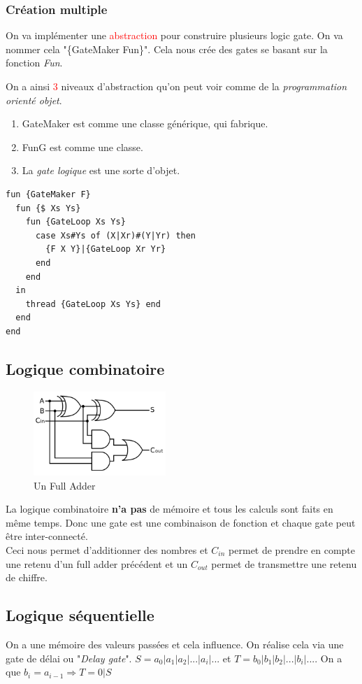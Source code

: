 \documentclass{report}
\begin{document}
\subsubsection{Création multiple}
On va implémenter une \textcolor{red}{abstraction} pour construire plusieurs logic gate. On va nommer cela "\{GateMaker Fun\}". Cela nous crée des gates se basant sur la fonction \textit{Fun}.\par
On a ainsi \textcolor{red}{3} niveaux d'abstraction qu'on peut voir comme de la \textit{programmation orienté objet}.
\begin{enumerate}
\item GateMaker est comme une classe générique, qui fabrique.
\item FunG est comme une classe.
\item La \textit{gate logique} est une sorte d'objet.
\end{enumerate}
\begin{lstlisting}[escapechar=\%]
fun {GateMaker F} 
  fun {$ Xs Ys} 
    fun {GateLoop Xs Ys} 
      case Xs#Ys of (X|Xr)#(Y|Yr) then
        {F X Y}|{GateLoop Xr Yr}
      end 
    end 
  in 
    thread {GateLoop Xs Ys} end 
  end
end
\end{lstlisting}

\subsection{Logique combinatoire}
\begin{figure}
\centering
\includegraphics[width=5cm]{img/fullAdder.png}
\caption{Un Full Adder}
\end{figure}
La logique combinatoire \textbf{n'a pas} de mémoire et tous les calculs sont faits en même temps. Donc une gate est une combinaison de fonction et chaque gate peut être inter-connecté.\\
Ceci nous permet d'additionner des nombres et $C_{in}$  permet de prendre en compte une retenu d'un full adder précédent et un $C_{out}$ permet de transmettre une retenu de chiffre.

\subsection{Logique séquentielle}
On a une mémoire des valeurs passées et cela influence. On réalise cela via une gate de délai ou "\textit{Delay gate}". $S=a_0 | a_1 | a_2 | ... | a_i | ...$ et $T=b_0 | b_1 | b_2 | ... | b_i | ...$. On a que $b_i = a_{i-1} \Rightarrow T=0|S$
\end{document}
